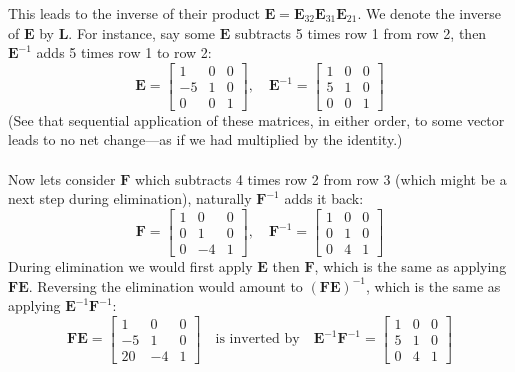 \documentclass{report}
\begin{document}
This leads to the inverse of their product $\bm E=\bm E_{32}\bm E_{31}\bm E_{21}$. We denote the inverse of $\bm E$ by $\bm L$. 
For instance, say some $\bm E$ subtracts 5 times row 1 from row 2, then $\bm E^{-1}$ adds 5 times row 1 to row 2:
\begin{equation*}
\bm E=\left[\begin{array}{ccc}
1&0&0\\-5&1&0\\0&0&1\end{array}\right],\quad
\bm E^{-1}=\left[\begin{array}{ccc}
1&0&0\\5&1&0\\0&0&1\end{array}\right]
\end{equation*}
(See that sequential application of these matrices, in either order, to some vector leads to no net change---as if we had multiplied by the identity.)\\
\vspace{1mm}\\
Now lets consider $\bm F$ which subtracts 4 times row 2 from row 3 (which might be a next step during elimination), naturally $\bm F^{-1}$ adds it back:
\begin{equation*}
\bm F=\left[\begin{array}{ccc}
1&0&0\\0&1&0\\0&-4&1\end{array}\right],\quad
\bm F^{-1}=\left[\begin{array}{ccc}
1&0&0\\0&1&0\\0&4&1\end{array}\right]
\end{equation*}
During elimination we would first apply $\bm E$ then $\bm F$, which is the same as applying $\bm{FE}$. Reversing the elimination would amount to 
$(\bm{FE})^{-1}$, which is the same as applying $\bm E^{-1}\bm F^{-1}$:
\begin{equation*}
\bm F\bm E=\left[\begin{array}{ccc}
1&0&0\\-5&1&0\\20&-4&1\end{array}\right]\quad\text{is inverted by}\quad
\bm E^{-1}\bm F^{-1}=\left[\begin{array}{ccc}
1&0&0\\5&1&0\\0&4&1\end{array}\right]
\end{equation*}
\end{document}
